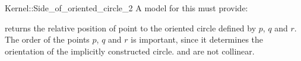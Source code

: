 \begin{ccRefFunctionObjectConcept}{Kernel::Side_of_oriented_circle_2}
A model for this must provide:


         {returns the relative position of point 
          to the oriented circle defined by $p$, $q$ and $r$.
          The order of the points $p$, $q$ and $r$ is important,
          since it determines the orientation of the implicitly
          constructed circle.
          \ccPrecond {} and  are not collinear.}

\end{ccRefFunctionObjectConcept}

